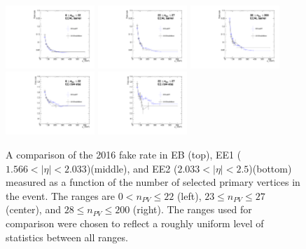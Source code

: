 \begin{figure}[!htbp]
\caption{A comparison of the 2016 fake rate in EB (top), EE1 ($1.566 \mathopen< |\eta| \mathclose< 2.033$)(middle), and EE2 ($2.033 \mathopen< \lvert \eta \rvert \mathclose< 2.5$)(bottom) measured as a function of the number of selected primary vertices in the event. The ranges are $0 \mathopen< n_{PV}\mathclose\leq 22$ (left), $23 \leq n_{PV} \mathclose\leq 27$ (center), and $28 \leq n_{PV}\mathclose\leq 200$ (right). The ranges used for comparison were chosen to reflect a roughly uniform level of statistics between all ranges.}
\centering
\includegraphics[width=0.3\textwidth]{fig/compare_pv_EB_2016_0to22.pdf}
\includegraphics[width=0.3\textwidth]{fig/compare_pv_EB_2016_23to27.pdf}
\includegraphics[width=0.3\textwidth]{fig/compare_pv_EB_2016_28to200.pdf}\\
\includegraphics[width=0.3\textwidth]{fig/compare_pv_EE1_2016_0to22.pdf}
\includegraphics[width=0.3\textwidth]{fig/compare_pv_EE1_2016_23to27.pdf}

\end{figure}
